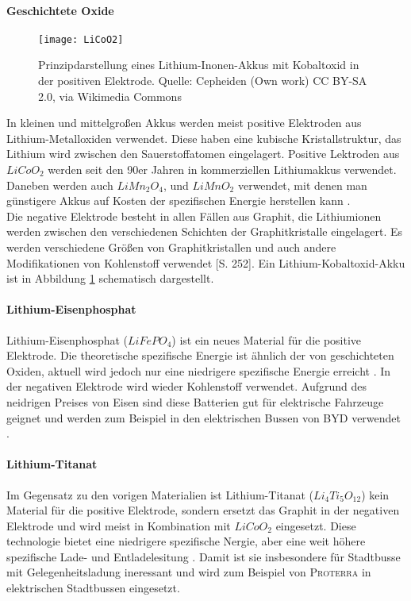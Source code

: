 \paragraph{Geschichtete Oxide}
\begin{figure}\centering
	 \texttt{[image: LiCoO2]}
	 \caption{Prinzipdarstellung eines Lithium-Inonen-Akkus mit Kobaltoxid in der positiven Elektrode. Quelle: Cepheiden (Own work) CC BY-SA 2.0, via Wikimedia Commons}
	 \label{abb_LiCoO2}
\end{figure}
In kleinen und mittelgroßen Akkus werden meist positive Elektroden aus Lithium-Metalloxiden verwendet. Diese haben eine kubische Kristallstruktur, das Lithium wird zwischen den Sauerstoffatomen eingelagert. Positive Lektroden aus $LiCoO_2$ werden seit den 90er Jahren in kommerziellen Lithiumakkus verwendet. Daneben werden auch $LiMn_2O_4$, und $LiMnO_2$ verwendet, mit denen man günstigere Akkus auf Kosten der spezifischen Energie herstellen kann \cite{whittingham2004lithium}.\\ %
Die negative Elektrode besteht in allen Fällen aus Graphit, die Lithiumionen werden zwischen den verschiedenen Schichten der Graphitkristalle eingelagert. Es werden verschiedene Größen von Graphitkristallen und auch andere Modifikationen von Kohlenstoff verwendet \cite{Sterner:2014}[S. 252]. Ein Lithium-Kobaltoxid-Akku ist in Abbildung \ref{abb_LiCoO2} schematisch dargestellt.
\paragraph{Lithium-Eisenphosphat}
Lithium-Eisenphosphat ($LiFePO_4$) ist ein neues Material für die positive Elektrode. Die theoretische spezifische Energie ist ähnlich der von geschichteten Oxiden, aktuell wird jedoch nur eine niedrigere spezifische Energie erreicht \cite{Tie201382}. In der negativen Elektrode wird wieder Kohlenstoff verwendet. Aufgrund des neidrigen Preises von Eisen sind diese Batterien gut für elektrische Fahrzeuge geignet und werden zum Beispiel in den elektrischen Bussen von \textsc{BYD} verwendet \cite{bydSpecs}.
\paragraph{Lithium-Titanat}
Im Gegensatz zu den vorigen Materialien ist Lithium-Titanat ($Li_4Ti_5O_{12}$) kein Material für die positive Elektrode, sondern ersetzt das Graphit in der negativen Elektrode und wird meist in Kombination mit $LiCoO_2$ eingesetzt. Diese technologie bietet eine niedrigere spezifische Nergie, aber eine weit höhere spezifische Lade- und Entladelesitung \cite{veneri2012charging}. Damit ist sie insbesondere für Stadtbusse mit Gelegenheitsladung ineressant und wird zum Beispiel von \textsc{Proterra} in elektrischen Stadtbussen eingesetzt.

